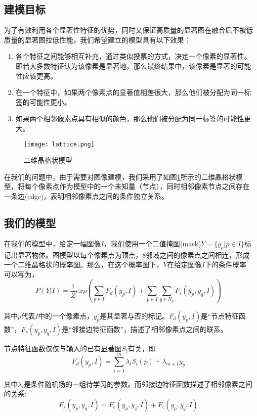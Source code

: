 \subsection{建模目标}
为了有效利用各个显著性特征的优势，同时又保证高质量的显著图在融合后不被低质量的显著图拉低性能，我们希望建立的模型具有以下效果：
\begin{enumerate}
\item 各个特征之间能够相互补充，通过类似投票的方式，决定一个像素的显著性。即若大多数特征认为该像素是显著地，那么最终结果中，该像素是显著的可能性应该更高。
\item 在一个特征中，如果两个像素点的显著值相差很大，那么他们被分配为同一标签的可能性更小。
\item 如果两个相邻像素点具有相似的颜色，那么他们被分配为同一标签的可能性更大。
\end{enumerate}

\begin{figure}
\centering
\texttt{[image: lattice.png]}
\caption{二维晶格状模型}\label{fig:lattice}
\end{figure}

在我们的问题中，由于需要对图像建模，我们采用了如图\ref{fig:lattice}所示的二维晶格状模型，将每个像素点作为模型中的一个未知量（节点），同时相邻像素节点之间存在一条边(edge)，表明相邻像素点之间的条件独立关系。

\subsection{我们的模型}
在我们的模型中，给定一幅图像$I$，我们使用一个二值掩图(mask)$Y=\{y_p|p\in I\}$标记出显著物体。图模型以每个像素点为顶点，8邻域之间的像素点之间相连，形成一个二维晶格状的概率图。那么，在这个概率图下，$Y$在给定图像$I$下的条件概率可以写为，
\begin{equation}
P(Y|I) = \frac{1}{Z}exp(\sum_{p\in I}F_d(y_p, I) + \sum_{p\in I}\sum_{q\in N_p}F_s(y_p,y_q,I) )
\end{equation}

其中$p$代表$I$中的一个像素点，$y_p$是其显著与否的标记。$F_d(y_p, I)$是“节点特征函数”，$F_s(y_p,y_q,I)$是“邻接边特征函数”，描述了相邻像素点之间的联系。

节点特征函数仅仅与输入的已有显著图$S_i$有关，即
\begin{equation}
F_d(y_p, I) = \sum_{i=1}^{m} \lambda_iS_i(p) + \lambda_{m+1}y_p
\end{equation}

其中$\lambda_i$是条件随机场的一组待学习的参数。而邻接边特征函数描述了相邻像素之间的关系:
\begin{equation}
F_s(y_p,y_q,I) = F_e(y_p,y_q,I) + F_c(y_p,y_q,I)
\end{equation}

